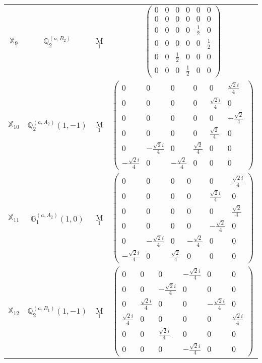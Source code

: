 \documentclass[fleqn,10pt,landscape]{article}
\begin{document}
\begin{itemize}
\begin{center}
\begin{longtable}{c|c|c|c}
$ \mathbb{X}_{9} $ & $\mathbb{Q}_{2}^{(a,B_{2})}$ & M$_{1}$ & $\begin{pmatrix} 0 & 0 & 0 & 0 & 0 & 0 \\ 0 & 0 & 0 & 0 & 0 & 0 \\ 0 & 0 & 0 & 0 & \frac{1}{2} & 0 \\ 0 & 0 & 0 & 0 & 0 & \frac{1}{2} \\ 0 & 0 & \frac{1}{2} & 0 & 0 & 0 \\ 0 & 0 & 0 & \frac{1}{2} & 0 & 0 \end{pmatrix}$ \\
$ \mathbb{X}_{10} $ & $\mathbb{Q}_{2}^{(a,A_{2})}(1,-1)$ & M$_{1}$ & $\begin{pmatrix} 0 & 0 & 0 & 0 & 0 & \frac{\sqrt{2} i}{4} \\ 0 & 0 & 0 & 0 & \frac{\sqrt{2} i}{4} & 0 \\ 0 & 0 & 0 & 0 & 0 & - \frac{\sqrt{2}}{4} \\ 0 & 0 & 0 & 0 & \frac{\sqrt{2}}{4} & 0 \\ 0 & - \frac{\sqrt{2} i}{4} & 0 & \frac{\sqrt{2}}{4} & 0 & 0 \\ - \frac{\sqrt{2} i}{4} & 0 & - \frac{\sqrt{2}}{4} & 0 & 0 & 0 \end{pmatrix}$ \\
$ \mathbb{X}_{11} $ & $\mathbb{G}_{1}^{(a,A_{2})}(1,0)$ & M$_{1}$ & $\begin{pmatrix} 0 & 0 & 0 & 0 & 0 & \frac{\sqrt{2} i}{4} \\ 0 & 0 & 0 & 0 & \frac{\sqrt{2} i}{4} & 0 \\ 0 & 0 & 0 & 0 & 0 & \frac{\sqrt{2}}{4} \\ 0 & 0 & 0 & 0 & - \frac{\sqrt{2}}{4} & 0 \\ 0 & - \frac{\sqrt{2} i}{4} & 0 & - \frac{\sqrt{2}}{4} & 0 & 0 \\ - \frac{\sqrt{2} i}{4} & 0 & \frac{\sqrt{2}}{4} & 0 & 0 & 0 \end{pmatrix}$ \\
$ \mathbb{X}_{12} $ & $\mathbb{Q}_{2}^{(a,B_{1})}(1,-1)$ & M$_{1}$ & $\begin{pmatrix} 0 & 0 & 0 & - \frac{\sqrt{2} i}{4} & 0 & 0 \\ 0 & 0 & - \frac{\sqrt{2} i}{4} & 0 & 0 & 0 \\ 0 & \frac{\sqrt{2} i}{4} & 0 & 0 & - \frac{\sqrt{2} i}{4} & 0 \\ \frac{\sqrt{2} i}{4} & 0 & 0 & 0 & 0 & \frac{\sqrt{2} i}{4} \\ 0 & 0 & \frac{\sqrt{2} i}{4} & 0 & 0 & 0 \\ 0 & 0 & 0 & - \frac{\sqrt{2} i}{4} & 0 & 0 \end{pmatrix}$ \\

\end{longtable}
\end{center}
\end{itemize}
\end{document}
